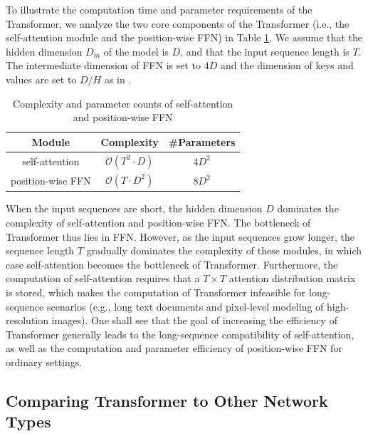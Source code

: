 \documentclass[manuscript,acmsmall,screen,nonacm]{acmart}
\theoremstyle{definition}
\begin{document}
To illustrate the computation time and parameter requirements of the Transformer, we analyze the two core components of the Transformer (i.e., the self-attention module and the position-wise FFN) in Table \ref{tab:complexity_attn_ffn}. We assume that the hidden dimension $D_m$ of the model is $D$, and that the input sequence length is $T$. The intermediate dimension of FFN is set to $4D$ and the dimension of keys and values are set to $D/H$ as in \citet{vaswani2017attention}.

\begin{table}[htbp]
    \caption{Complexity and parameter counts of self-attention and position-wise FFN}
    \label{tab:complexity_attn_ffn}
    \centering
    \begin{tabular}{c|c|c}
    \hline
     Module & Complexity & \#Parameters\\
    \hline
     self-attention & $\mathcal O(T^2\cdot D)$ & $4D^2$\\
    \hline
     position-wise FFN & $\mathcal O(T\cdot D^2)$ & $8D^2$\\
    \hline
    \end{tabular}
\end{table}

When the input sequences are short, the hidden dimension $D$ dominates the complexity of self-attention and position-wise FFN. The bottleneck of Transformer thus lies in FFN. However, as the input sequences grow longer, the sequence length $T$ gradually dominates the complexity of these modules, in which case self-attention becomes the bottleneck of Transformer. Furthermore, the computation of self-attention requires that a $T\times T$ attention distribution matrix is stored, which makes the computation of Transformer infeasible for long-sequence scenarios (e.g., long text documents and pixel-level modeling of high-resolution images). One shall see that the goal of increasing the efficiency of Transformer generally leads to the long-sequence compatibility of self-attention, as well as the computation and parameter efficiency of position-wise FFN for ordinary settings.

\subsection{Comparing Transformer to Other Network Types}
\end{document}
